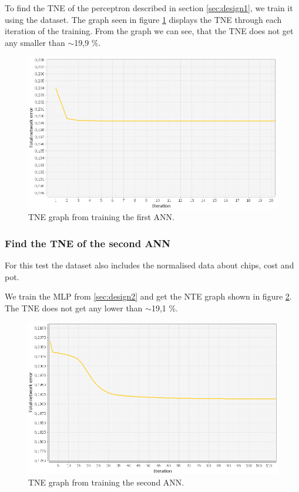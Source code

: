 To find the TNE of the perceptron described in section \ref{sec:design1}, we train it using the dataset. The graph seen in figure \ref{fig:tneg1} displays the TNE through each iteration of the training. From the graph we can see, that the TNE does not get any smaller than $\sim$19,9 \%.

\begin{figure}[H]
  \center
    \includegraphics[scale=0.6]{images/nn/default-nn1-err.png}
  \caption{TNE graph from training the first ANN.\label{fig:tneg1}}
\end{figure}

\subsubsection{Find the TNE of the second ANN}
\label{sec:ann-test2}
For this test the dataset also includes the normalised data about chips, cost and pot.

We train the MLP from \ref{sec:design2} and get the NTE graph shown in figure \ref{fig:tneg2}. The TNE does not get any lower than $\sim$19,1 \%.

\begin{figure}[H]
  \center
    \includegraphics[scale=0.6]{images/nn/default-nn2-err.png}
  \caption{TNE graph from training the second ANN.\label{fig:tneg2}}
\end{figure}


